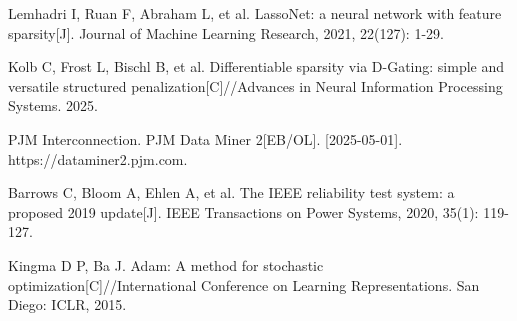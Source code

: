 Lemhadri I, Ruan F, Abraham L, et al. LassoNet: a neural network with feature sparsity[J]. Journal of Machine Learning Research, 2021, 22(127): 1-29.

Kolb C, Frost L, Bischl B, et al. Differentiable sparsity via D-Gating: simple and versatile structured penalization[C]//Advances in Neural Information Processing Systems. 2025.

PJM Interconnection. PJM Data Miner 2[EB/OL]. [2025-05-01]. https://dataminer2.pjm.com.

Barrows C, Bloom A, Ehlen A, et al. The IEEE reliability test system: a proposed 2019 update[J]. IEEE Transactions on Power Systems, 2020, 35(1): 119-127.

Kingma D P, Ba J. Adam: A method for stochastic optimization[C]//International Conference on Learning Representations. San Diego: ICLR, 2015.
